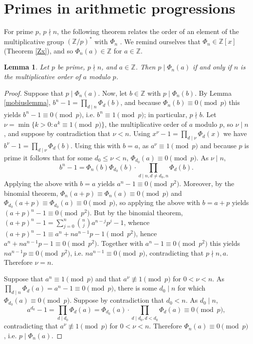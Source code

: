 \documentclass{article}
\newtheorem{lemma}[theorem]{Lemma}
\theoremstyle{definition}
\begin{document}
\section{Primes in arithmetic progressions}
For prime $p$, $p \nmid n$, the following theorem
relates the order of an element of the multiplicative group $(\mathbb{Z}/p)^*$ 
with $\Phi_n$ \cite[p.~13, Lemma 2.9]{washington}.
We remind ourselves that $\Phi_n \in \mathbb{Z}[x]$ (Theorem \ref{Zx}), and so
$\Phi_n(a) \in \mathbb{Z}$ for $a \in \mathbb{Z}$.

\begin{lemma}
Let $p$ be prime, $p  \nmid n$, and $a \in \mathbb{Z}$. Then $p \mid \Phi_n(a)$ if and only if
$n$ is the multiplicative order of $a$ modulo $p$.
\label{multiplicativeorder}
\end{lemma}
\begin{proof}
Suppose that $p \mid \Phi_n(a)$. Now, let
$b \in \mathbb{Z}$ with 
 $p \mid \Phi_n(b)$. By Lemma \ref{mobiuslemma}, 
$b^n-1 = \prod_{d \mid n} \Phi_d(b)$,
and because $\Phi_n(b) \equiv 0 \pmod{p}$ this yields
$b^n-1 \equiv 0 \pmod{p}$, i.e. $b^n \equiv 1 \pmod{p}$; in particular, $p \nmid b$.
Let $\nu = \min \{k > 0: a^k \equiv 1 \pmod{p}\}$, the multiplicative order of $a$ modulo $p$, so $\nu \mid n$, and
suppose by contradiction that $\nu<n$. Using $x^\nu - 1 = \prod_{d \mid \nu} \Phi_d(x)$ we have
$b^\nu - 1 = \prod_{d \mid \nu} \Phi_d(b)$.
Using this with $b=a$, as $a^\nu \equiv 1 \pmod{p}$ and because $p$ is prime it follows
that for some $d_0 \leq \nu < n$, $\Phi_{d_0}(a) \equiv 0 \pmod{p}$. As $\nu \mid n$, 
\[
b^n-1 = \Phi_n(b) \Phi_{d_0}(b)  \cdot \prod_{d \mid n, d \neq d_0, n} \Phi_d(b).
\]
Applying the above with $b=a$ yields $a^n-1 \equiv 0 \pmod{p^2}$. 
Moreover, by the binomial theorem, $\Phi_n(a+p) \equiv \Phi_n(a) \equiv 0 \pmod{p}$ and
$\Phi_{d_0}(a+p) \equiv \Phi_{d_0}(a) \equiv 0 \pmod{p}$, so applying the above with $b=a+p$ yields
$(a+p)^n - 1 \equiv 0 \pmod{p^2}$.
But by the binomial theorem, $(a+p)^n -1 = \sum_{j=0}^n \binom{n}{j} a^{n-j} p^j - 1$, whence
$(a+p)^n - 1 \equiv a^n + na^{n-1}p - 1 \pmod{p^2}$,
hence $a^n + na^{n-1}p -1 \equiv 0 \pmod{p^2}$.
Together with $a^n-1 \equiv 0 \pmod{p^2}$ this yields
$na^{n-1}p \equiv 0 \pmod{p^2}$, i.e. $na^{n-1} \equiv 0 \pmod{p}$, contradicting that $p \nmid n, a$. 
Therefore $\nu = n$.

Suppose that $a^n \equiv 1 \pmod{p}$ and that $a^\nu \not \equiv 1 \pmod{p}$ for $0<\nu<n$. 
As $ \prod_{d \mid n} \Phi_d(a) = a^n - 1 \equiv 0 \pmod{p}$, 
there is some $d_0 \mid n$ for which $\Phi_{d_0}(a) \equiv 0 \pmod{p}$. Suppose by contradiction that
$d_0<n$. As $d_0 \mid n$,
\[
a^{d_0}-1 = \prod_{d \mid d_0} \Phi_d(a) = \Phi_{d_0}(a) \cdot \prod_{d \mid d_0, d<d_0} \Phi_d(a) \equiv 0 \pmod{p},
\]
contradicting that $a^\nu \not \equiv 1 \pmod{p}$ for $0<\nu<n$. Therefore $\Phi_n(a) \equiv 0 \pmod{p}$, i.e.
$p \mid \Phi_n(a)$.
\end{proof}
\end{document}
